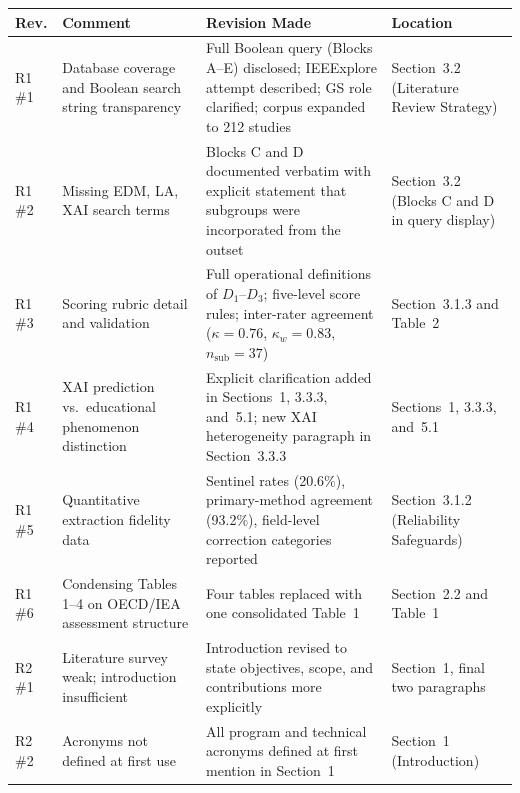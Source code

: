 \documentclass[12pt, a4paper]{article}
\begin{document}
\medskip
\renewcommand{\arraystretch}{1.4}
\begin{longtable}{p{1.2cm} p{3.3cm} p{4.0cm} p{5.5cm}}
\toprule
\textbf{Rev.} & \textbf{Comment} & \textbf{Revision Made} & \textbf{Location} \\
\midrule
\endhead

R1\,\#1 & Database coverage and Boolean search string transparency
         & Full Boolean query (Blocks A--E) disclosed; IEEExplore attempt described; GS role
           clarified; corpus expanded to 212 studies
         & Section~3.2 (Literature Review Strategy) \\

R1\,\#2 & Missing EDM, LA, XAI search terms
         & Blocks C and D documented verbatim with explicit statement that subgroups were
           incorporated from the outset
         & Section~3.2 (Blocks C and D in query display) \\

R1\,\#3 & Scoring rubric detail and validation
         & Full operational definitions of $D_1$--$D_3$; five-level score rules; inter-rater
           agreement ($\kappa=0.76$, $\kappa_w=0.83$, $n_{\mathrm{sub}}=37$)
         & Section~3.1.3 and Table~2 \\

R1\,\#4 & XAI prediction vs.\ educational phenomenon distinction
         & Explicit clarification added in Sections~1, 3.3.3, and~5.1; new XAI heterogeneity
           paragraph in Section~3.3.3
         & Sections~1, 3.3.3, and~5.1 \\

R1\,\#5 & Quantitative extraction fidelity data
         & Sentinel rates (20.6\%), primary-method agreement (93.2\%), field-level correction
           categories reported
         & Section~3.1.2 (Reliability Safeguards) \\

R1\,\#6 & Condensing Tables 1--4 on OECD/IEA assessment structure
         & Four tables replaced with one consolidated Table~1
         & Section~2.2 and Table~1 \\

R2\,\#1 & Literature survey weak; introduction insufficient
         & Introduction revised to state objectives, scope, and contributions more explicitly
         & Section~1, final two paragraphs \\

R2\,\#2 & Acronyms not defined at first use
         & All program and technical acronyms defined at first mention in Section~1
         & Section~1 (Introduction) \\


\end{longtable}
\end{document}
